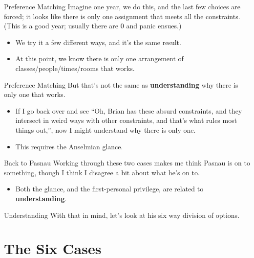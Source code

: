 \documentclass[
  17pt,
  letterpaper,
  ignorenonframetext,
  aspectratio=169,
  handout]{beamer}
\providecommand{\tightlist}{%
  \setlength{\itemsep}{0pt}\setlength{\parskip}{0pt}}\usepackage{longtable,booktabs,array}
\begin{document}
\begin{frame}{Preference Matching}
\protect\hypertarget{preference-matching-2}{}
Imagine one year, we do this, and the last few choices are forced; it
looks like there is only one assignment that meets all the constraints.
(This is a good year; usually there are 0 and panic ensues.)

\begin{itemize}[<+->]
\tightlist
\item
  We try it a few different ways, and it's the same result.
\item
  At this point, we know there is only one arrangement of
  classes/people/times/rooms that works.
\end{itemize}
\end{frame}

\begin{frame}{Preference Matching}
\protect\hypertarget{preference-matching-3}{}
But that's not the same as \textbf{understanding} why there is only one
that works.

\begin{itemize}[<+->]
\tightlist
\item
  If I go back over and see ``Oh, Brian has these absurd constraints,
  and they intersect in weird ways with other constraints, and that's
  what rules most things out,'', now I might understand why there is
  only one.
\item
  This requires the Anselmian glance.
\end{itemize}
\end{frame}

\begin{frame}{Back to Pasnau}
\protect\hypertarget{back-to-pasnau}{}
Working through these two cases makes me think Pasnau is on to
something, though I think I disagree a bit about what he's on to.

\begin{itemize}[<+->]
\tightlist
\item
  Both the glance, and the first-personal privilege, are related to
  \textbf{understanding}.
\end{itemize}
\end{frame}

\begin{frame}{Understanding}
\protect\hypertarget{understanding}{}
With that in mind, let's look at his six way division of options.
\end{frame}

\hypertarget{the-six-cases}{%
\section{The Six Cases}\label{the-six-cases}}
\end{document}
